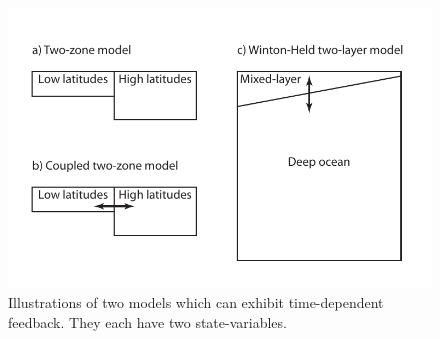 \documentclass[12pt]{book}
\begin{document}
\begin{figure}
\begin{center}
\includegraphics[width=12 cm]{../illustrations/Time-dependent_models.pdf}
\end{center}
\caption{ Illustrations of two models which can exhibit time-dependent feedback. They each have two state-variables.  } 
\label{fig:time-models}
\end{figure}
\end{document}
